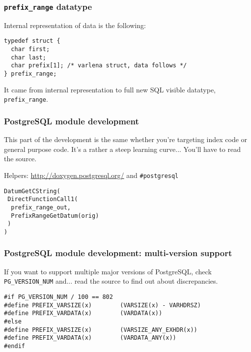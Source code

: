 \documentclass{beamer}
\begin{document}
\begin{frame}[fragile]
  \frametitle{\texttt{prefix\_range} datatype}

  Internal representation of data is the following:

  \begin{example}
  \begin{verbatim}
typedef struct {
  char first;
  char last;
  char prefix[1]; /* varlena struct, data follows */
} prefix_range;
  \end{verbatim}
  \end{example}

  It came from internal representation to full new SQL visible datatype,
  \texttt{prefix\_range}.
\end{frame}

\begin{frame}[fragile]
  \frametitle{PostgreSQL module development}

  This part of the development is the same whether you're targeting index
  code or general purpose code. It's a rather a steep learning
  curve... You'll have to read the source.

  Helpers: \url{http://doxygen.postgresql.org/} and \texttt{\#postgresql}

  \begin{example}
  \begin{verbatim}
DatumGetCString(
 DirectFunctionCall1(
  prefix_range_out,
  PrefixRangeGetDatum(orig)
 )
)
  \end{verbatim}
  \end{example}
\end{frame}

\begin{frame}[fragile]
  \frametitle{PostgreSQL module development: multi-version support}

  If you want to support multiple major versions of PostgreSQL, check
  \texttt{PG\_VERSION\_NUM} and... read the source to find out about
  discrepancies.

  \begin{example}
  \begin{verbatim}
#if PG_VERSION_NUM / 100 == 802
#define PREFIX_VARSIZE(x)        (VARSIZE(x) - VARHDRSZ)
#define PREFIX_VARDATA(x)        (VARDATA(x))
#else
#define PREFIX_VARSIZE(x)        (VARSIZE_ANY_EXHDR(x))
#define PREFIX_VARDATA(x)        (VARDATA_ANY(x))
#endif
  \end{verbatim}
  \end{example}
\end{frame}
\end{document}
